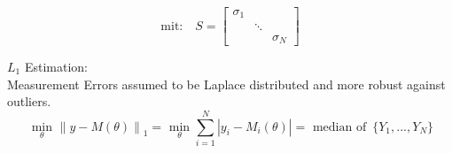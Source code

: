 \begin{tcolorbox}[colback=yellow!5!white,colframe=yellow!75!white,coltitle=black,title=\textbf{Maximum Likelihood Estimation}]
	\begin{equation*}
	\text{mit:} \quad S = \begin{bmatrix}
	\sigma_{ 1 } & & \\
	& \ddots & \\
	& & \sigma_{ N }
	\end{bmatrix}
	\end{equation*}
	
	\({L}_{1}\) Estimation:\\
	Measurement Errors assumed to be Laplace distributed and more robust against outliers.
	\begin{equation*}
	\underset { \theta  }{ \text{ min }} { \parallel y-M(\theta )\parallel  }_{ 1 } = \underset { \theta  }{ \text{ min } } \sum_{ i=1 }^{ N }{ |{ y }_{ i } - { M }_{ i } (\theta) | } = \text{ median of } \, \{ {Y}_{1},...,{Y}_{N} \}
	\end{equation*}
	
\end{tcolorbox}

